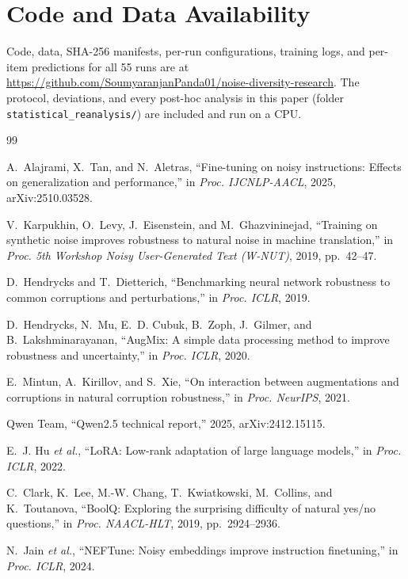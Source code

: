 \documentclass[conference]{IEEEtran}
\begin{document}
\section*{Code and Data Availability}
Code, data, SHA-256 manifests, per-run configurations, training logs, and per-item predictions for all 55 runs are at \url{https://github.com/SoumyaranjanPanda01/noise-diversity-research}. The protocol, deviations, and every post-hoc analysis in this paper (folder \texttt{statistical\_reanalysis/}) are included and run on a CPU.

\begin{thebibliography}{99}

A.~Alajrami, X.~Tan, and N.~Aletras, ``Fine-tuning on noisy instructions: Effects on generalization and performance,'' in \emph{Proc. IJCNLP-AACL}, 2025, arXiv:2510.03528.

V.~Karpukhin, O.~Levy, J.~Eisenstein, and M.~Ghazvininejad, ``Training on synthetic noise improves robustness to natural noise in machine translation,'' in \emph{Proc. 5th Workshop Noisy User-Generated Text (W-NUT)}, 2019, pp.~42--47.

D.~Hendrycks and T.~Dietterich, ``Benchmarking neural network robustness to common corruptions and perturbations,'' in \emph{Proc. ICLR}, 2019.

D.~Hendrycks, N.~Mu, E.~D. Cubuk, B.~Zoph, J.~Gilmer, and B.~Lakshminarayanan, ``{AugMix}: A simple data processing method to improve robustness and uncertainty,'' in \emph{Proc. ICLR}, 2020.

E.~Mintun, A.~Kirillov, and S.~Xie, ``On interaction between augmentations and corruptions in natural corruption robustness,'' in \emph{Proc. NeurIPS}, 2021.

Qwen Team, ``{Qwen2.5} technical report,'' 2025, arXiv:2412.15115.

E.~J. Hu \emph{et al.}, ``{LoRA}: Low-rank adaptation of large language models,'' in \emph{Proc. ICLR}, 2022.

C.~Clark, K.~Lee, M.-W. Chang, T.~Kwiatkowski, M.~Collins, and K.~Toutanova, ``{BoolQ}: Exploring the surprising difficulty of natural yes/no questions,'' in \emph{Proc. NAACL-HLT}, 2019, pp.~2924--2936.

N.~Jain \emph{et al.}, ``{NEFTune}: Noisy embeddings improve instruction finetuning,'' in \emph{Proc. ICLR}, 2024.


\end{thebibliography}
\end{document}
